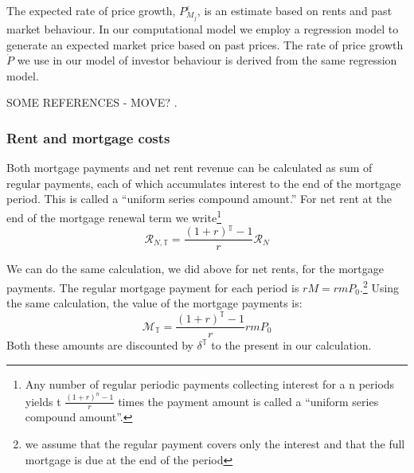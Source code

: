 {%


The expected rate of price growth, $P_{M_j}^\epsilon$, is an estimate based on rents and past market behaviour. In our computational model we employ a regression model to generate an \gls{expected market price} based on past prices. The rate of price growth $\dot P$ we use in our model of investor behaviour is derived from the same regression model.

SOME REFERENCES - MOVE? \cite{anselinModernSpatialEconometrics2014, gelmanDataAnalysisUsing2006}.


 
\subsubsection{Rent and mortgage costs}
Both mortgage payments and net rent revenue can be calculated as sum  of regular payments, each of which accumulates interest to the end of the mortgage period. This is called a ``uniform series compound amount.'' For net rent at the end of the mortgage renewal term we write\footnote{Any number of regular periodic payments collecting interest for a n periods yields t  $\frac{(1+r)^n-1}{r}$ times the payment amount is called a  ``uniform series compound amount''.%
} 
\begin{equation}
\mathcal{R}_{N, \mathbb{T}}= \frac{(1+r)\mathbb{^\mathbb{T}}-1}{r}\mathcal{R}_N     
\end{equation}




We can do the same calculation, we did above for net rents, for the mortgage payments.
The regular mortgage payment for each period is $rM=rmP_0$.\footnote{we assume that the regular payment covers only the interest and that the full mortgage is due at the end of the period } Using the same calculation, the value of the mortgage payments is: %
\begin{equation}
\mathcal{M}_{\mathbb{T}} = \frac{(1+r)^\mathbb{T}-1}{r}rmP_0  
\end{equation}
  Both these amounts are discounted by $\delta^\mathbb{T}$ to the present in our calculation.
 
}
